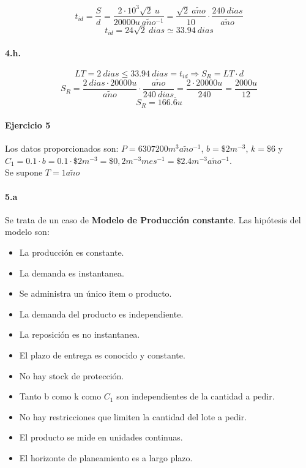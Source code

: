 \documentclass[a4paper,10pt]{article}
\def \anio {a\tilde{n}o}
\begin{document}
        $$ t_{id} = \frac{S}{d} = \frac{2 \cdot 10^3 \sqrt {2}\ u}{20000u\ \anio^{-1}} = \frac{\sqrt{2}\ \anio}{10} \cdot \frac{240\ dias}{\anio} $$
        $$ \boxed{ t_{id} = 24\sqrt{2}\ dias \simeq 33.94\ dias } $$
    
    \paragraph{4.h.}
        $$ LT = 2\ dias \leq 33.94\ dias = t_{id} \Rightarrow S_R = LT \cdot d $$
        $$ S_R = \frac{2\ dias \cdot 20000u}{\anio} \cdot \frac{\anio}{240\ dias} = \frac{2 \cdot 20000u}{240} = \frac{2000u}{12} $$
        $$ \boxed{S_R = 166.\overline{6} u} $$


\paragraph{Ejercicio 5}
Los datos proporcionados son: $P = 6307200 m^3 \anio^{-1} $, $b = \$2 m^{-3} $, $k = \$6 $ y $C_1 = 0.1 \cdot b = 0.1 \cdot \$2 m^{-3} = \$0,2 m^{-3}mes^{-1} = \$2.4 m^{-3}\anio^{-1} $. \\
Se supone $T = 1 \anio$
  \paragraph{5.a}
  Se trata de un caso de {\bf Modelo de Producci\'on constante}. Las hip\'otesis del modelo son:
 \begin{itemize}
  \item La producci\'on es constante.
  \item La demanda es instantanea.
  \item Se administra un \'unico item o producto.
  \item La demanda del producto es independiente.
  \item La reposici\'on es no instantanea.
  \item El plazo de entrega es conocido y constante.
  \item No hay stock de protecci\'on.
  \item Tanto b como k como $ C_1 $ son independientes de la cantidad a pedir.
  \item No hay restricciones que limiten la cantidad del lote a pedir.
  \item El producto se mide en unidades continuas.
  \item El horizonte de planeamiento es a largo plazo.
 \end{itemize}
\end{document}
